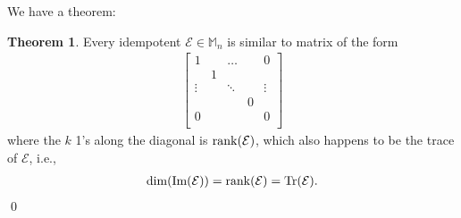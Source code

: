 \documentclass{book}
\theoremstyle{definition}
\newtheorem{thm}{Theorem}[section]
\newcommand{\E}{\mathcal{E}}
\newcommand{\ima}{\text{Im}}
\begin{document}
We have a theorem:

\begin{thm}
	Every idempotent $\E \in \mathbb{M}_n$ is similar to  matrix of the form
	\begin{align*}
	\begin{bmatrix}
	1 & & \dots & &0 \\
	& 1 & & &\\
	\vdots & & \ddots & &\vdots\\
	& & & 0 &\\
	0 & & & &0\\
	\end{bmatrix}
	\end{align*}
	where the $k$ 1's along the diagonal is $\rank(\E)$, which also happens to be the trace of $\E$, i.e.,
	\begin{align*}
	\dim(\ima(\E)) = \rank(\E) = \Tr(\E).
	\end{align*}
	\qed
\end{thm}
\end{document}
